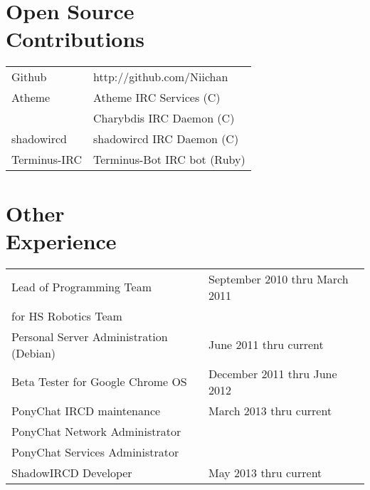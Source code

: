 \documentclass[line, margin, 10pt]{res}
\begin{document}
\begin{resume}
\section{Open Source \\ Contributions}
\begin{tabular}{l l}
Github & http://github.com/Niichan \\ [5pt]
Atheme & Atheme IRC Services (C) \\ [5pt]
& Charybdis IRC Daemon (C) \\ [5pt]
shadowircd & shadowircd IRC Daemon (C) \\ [5pt]
Terminus-IRC & Terminus-Bot IRC bot (Ruby) \\ [5pt]
\end{tabular}

\section{Other \\ Experience}
\begin{tabular}{l l}
 Lead of Programming Team & \hfill September 2010 thru March 2011 \\ 
 for HS Robotics Team & \\ [6pt]
 Personal Server Administration (Debian) & \hfill June 2011 thru current  \\ [6pt]
 Beta Tester for Google Chrome OS & \hfill December 2011 thru June 2012 \\ [6pt]
 PonyChat IRCD maintenance & \hfill March 2013 thru current \\ 
 PonyChat Network Administrator & \hfill \\ 
 PonyChat Services Administrator & \hfill \\ [6pt]
 ShadowIRCD Developer & \hfill May 2013 thru current \\ [5pt]
\end{tabular}
     
\end{resume}
\end{document}
